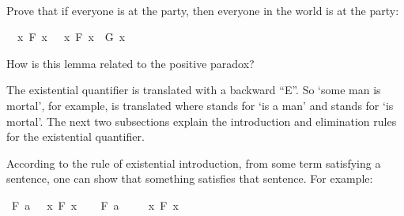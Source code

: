 \begin{isabellebody}
\isadelimproof
\ %
\endisadelimproof
%
\isatagproof
{}\isamarkupfalse%
%
\endisatagproof
{\isafoldproof}%
%
\isadelimproof
%
\endisadelimproof
%
\begin{isamarkuptext}%
\begin{Exercise} Prove that if everyone is at the party, then everyone in the world is at the party: \end{Exercise}%
\end{isamarkuptext}\isamarkuptrue%
\isamarkupfalse%
\ {\isachardoublequoteopen}{\isacharparenleft}{\isasymforall}\ x{\isachardot}\ F\ x{\isacharparenright}\ {\isasymlongrightarrow}\ {\isacharparenleft}{\isasymforall}\ x{\isachardot}\ F\ x\ {\isasymlongrightarrow}\ G\ x{\isacharparenright}{\isachardoublequoteclose}%
\isadelimproof
\ %
\endisadelimproof
%
\isatagproof
{}\isamarkupfalse%
%
\endisatagproof
{\isafoldproof}%
%
\isadelimproof
%
\endisadelimproof
%
\begin{isamarkuptext}%
How is this lemma related to the positive paradox?%
\end{isamarkuptext}\isamarkuptrue%
%
\isamarkuptrue%
%
\begin{isamarkuptext}%
The existential quantifier is translated with a backward ``E''. So `some man is mortal', for
example, is translated  where  stands for `is a man'
and  stands for `is mortal'. The next two subsections explain the introduction and
elimination rules for the existential quantifier.%
\end{isamarkuptext}\isamarkuptrue%
%
\isamarkuptrue%
%
\begin{isamarkuptext}%
According to the rule of existential introduction, from some term satisfying a sentence,
one can show that something satisfies that sentence. For example:%
\end{isamarkuptext}\isamarkuptrue%
\isamarkupfalse%
\ {\isachardoublequoteopen}F\ a\ {\isasymlongrightarrow}\ {\isacharparenleft}{\isasymexists}\ x{\isachardot}\ F\ x{\isacharparenright}{\isachardoublequoteclose}\isanewline
%
\isadelimproof
%
\endisadelimproof
%
\isatagproof
{}\isamarkupfalse%
\isanewline
\ \ \isamarkupfalse%
\ {\isachardoublequoteopen}F\ a{\isachardoublequoteclose}\isanewline
\ \ \isamarkupfalse%
\ {\isachardoublequoteopen}{\isasymexists}\ x{\isachardot}\ F\ x{\isachardoublequoteclose}\ \isamarkupfalse%

\end{isabellebody}
